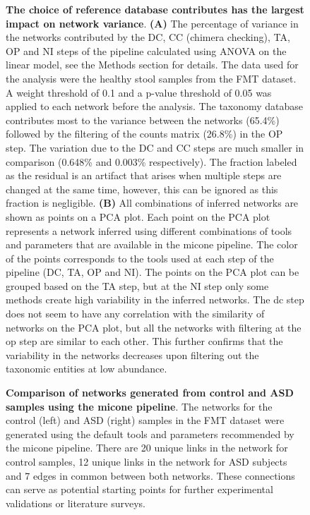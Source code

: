   \begin{figure}[H]
    \centering
      \caption{
      \textbf{The choice of reference database contributes has the largest impact on network variance}.
      \textbf{(A)} The percentage of variance in the networks contributed by the DC, CC (chimera checking), TA, OP and NI steps of the pipeline calculated using ANOVA on the linear model, see the Methods section for details.
      The data used for the analysis were the healthy stool samples from the FMT dataset.
      A weight threshold of 0.1 and a p-value threshold of 0.05 was applied to each network before the analysis.
      The taxonomy database contributes most to the variance between the networks (65.4\%) followed by the filtering of the counts matrix (26.8\%) in the OP step.
    The variation due to the DC and CC steps are much smaller in comparison (0.648\% and 0.003\% respectively).
      The fraction labeled as the residual is an artifact that arises when multiple steps are changed at the same time, however, this can be ignored as this fraction is negligible.
      \textbf{(B)} All combinations of inferred networks are shown as points on a PCA plot.
      Each point on the PCA plot represents a network inferred using different combinations of tools and parameters that are available in the \ac{micone} pipeline.
      The color of the points corresponds to the tools used at each step of the pipeline (DC, TA, OP and NI).
      The points on the PCA plot can be grouped based on the TA step, but at the NI step only some methods create high variability in the inferred networks.
      The \ac{dc} step does not seem to have any correlation with the similarity of networks on the PCA plot, but all the networks with filtering at the \ac{op} step are similar to each other.
      This further confirms that the variability in the networks decreases upon filtering out the taxonomic entities at low abundance.
    }
    \label{fig:figure6}
  \end{figure}


  \begin{figure}[H]
    \centering
    \caption{
      \textbf{Comparison of networks generated from control and ASD samples using the \ac{micone} pipeline}.
      The networks for the control (left) and ASD (right) samples in the FMT dataset were generated using the default tools and parameters recommended by the \ac{micone} pipeline.
      There are 20 unique links in the network for control samples, 12 unique links in the network for ASD subjects and 7 edges in common between both networks.
      These connections can serve as potential starting points for further experimental validations or literature surveys.
    }
    \label{fig:figure7}
  \end{figure}



